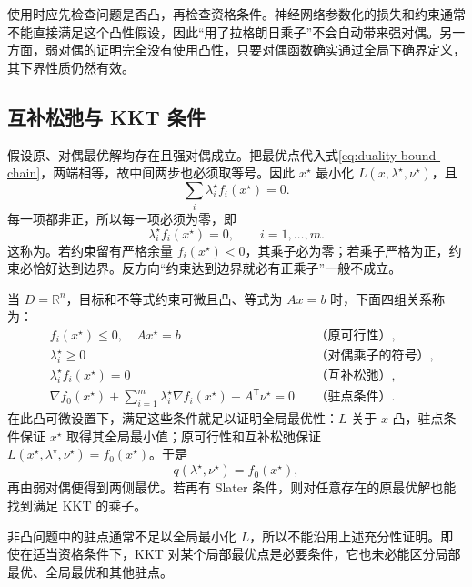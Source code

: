 \documentclass[UTF8]{ctexart}
\begin{document}
使用时应先检查问题是否凸，再检查资格条件。神经网络参数化的损失和约束通常不能直接满足这个凸性假设，因此“用了拉格朗日乘子”不会自动带来强对偶。另一方面，弱对偶的证明完全没有使用凸性，只要对偶函数确实通过全局下确界定义，其下界性质仍然有效。

\subsection{互补松弛与 KKT 条件}

假设原、对偶最优解均存在且强对偶成立。把最优点代入式\eqref{eq:duality-bound-chain}，两端相等，故中间两步也必须取等号。因此 $x^\star$ 最小化 $L(x,\lambda^\star,\nu^\star)$，且
\[
 \sum_i\lambda_i^\star f_i(x^\star)=0.
\]
每一项都非正，所以每一项必须为零，即
\begin{equation}
 \lambda_i^\star f_i(x^\star)=0,\qquad i=1,\ldots,m.
 \label{eq:duality-complementarity}
\end{equation}
这称为。若约束留有严格余量 $f_i(x^\star)<0$，其乘子必为零；若乘子严格为正，约束必恰好达到边界。反方向“约束达到边界就必有正乘子”一般不成立。

当 $D=\mathbb R^n$，目标和不等式约束可微且凸、等式为 $Ax=b$ 时，下面四组关系称为：
\begin{equation}
 \begin{aligned}
 &f_i(x^\star)\leq0,\quad Ax^\star=b
 &&\text{（原可行性）},\\
 &\lambda_i^\star\geq0
 &&\text{（对偶乘子的符号）},\\
 &\lambda_i^\star f_i(x^\star)=0
 &&\text{（互补松弛）},\\
 &\nabla f_0(x^\star)+\sum_{i=1}^m\lambda_i^\star\nabla f_i(x^\star)
       +A^{\mathsf T}\nu^\star=0
 &&\text{（驻点条件）}.
 \end{aligned}
 \label{eq:duality-kkt}
\end{equation}
在此凸可微设置下，满足这些条件就足以证明全局最优性：$L$ 关于 $x$ 凸，驻点条件保证 $x^\star$ 取得其全局最小值；原可行性和互补松弛保证 $L(x^\star,\lambda^\star,\nu^\star)=f_0(x^\star)$。于是
\[
 q(\lambda^\star,\nu^\star)=f_0(x^\star),
\]
再由弱对偶便得到两侧最优。若再有 Slater 条件，则对任意存在的原最优解也能找到满足 KKT 的乘子。

非凸问题中的驻点通常不足以全局最小化 $L$，所以不能沿用上述充分性证明。即使在适当资格条件下，KKT 对某个局部最优点是必要条件，它也未必能区分局部最优、全局最优和其他驻点。
\end{document}
